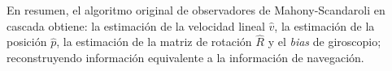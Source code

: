 \documentclass[10pt]{report}
\numberwithin{equation}{chapter}
\numberwithin{algorithm}{chapter}
\newcommand{\bias}{\emph{bias} }
\begin{document}
En resumen, el algoritmo original de observadores de Mahony-Scandaroli en cascada obtiene: la estimación de la velocidad lineal $\hat{v}$, la estimación de la posición $\hat{p}$, la estimación de la matriz de rotación $\hat{R}$ y el \emph{bias} de giroscopio; reconstruyendo información equivalente a la información de navegación.
\end{document}
